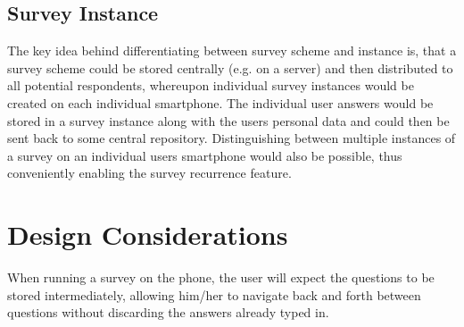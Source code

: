 \subsection{Survey Instance}
\label{subsec:surveyinstance}
The key idea behind differentiating between survey scheme and instance is, that a survey scheme could be stored centrally (e.g. on a server) and then distributed to all potential respondents, whereupon individual survey instances would be created on each individual smartphone. The individual user answers would be stored in a survey instance along with the users personal data and could then be sent back to some central repository. Distinguishing between multiple instances of a survey on an individual users smartphone would also be possible, thus conveniently enabling the survey recurrence feature.

\section{Design Considerations}
\label{sec:designconsiderations}
When running a survey on the phone, the user will expect the questions to be stored intermediately, allowing him/her to navigate back and forth between questions without discarding the answers already typed in.

\begin{figure}[!htbp]
\end{figure}